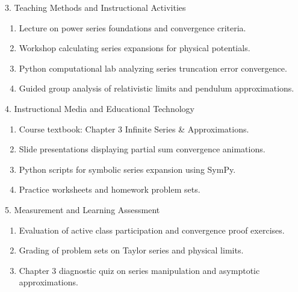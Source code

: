 \newpage

\begin{planbox}[colframe=rbruNavy!85!black, colbacktitle=rbruNavy!85!black]{3. Teaching Methods and Instructional Activities}
\begin{enumerate}[topsep=2pt, itemsep=1pt, partopsep=0pt, parsep=0pt, leftmargin=1.5em]
    \item Lecture on power series foundations and convergence criteria.
    \item Workshop calculating series expansions for physical potentials.
    \item Python computational lab analyzing series truncation error convergence.
    \item Guided group analysis of relativistic limits and pendulum approximations.
\end{enumerate}
\end{planbox}

\begin{planbox}[colframe=rbruGold!90!black, colbacktitle=rbruGold!90!black]{4. Instructional Media and Educational Technology}
\begin{enumerate}[topsep=2pt, itemsep=1pt, partopsep=0pt, parsep=0pt, leftmargin=1.5em]
    \item Course textbook: Chapter 3 Infinite Series \& Approximations.
    \item Slide presentations displaying partial sum convergence animations.
    \item Python scripts for symbolic series expansion using SymPy.
    \item Practice worksheets and homework problem sets.
\end{enumerate}
\end{planbox}

\begin{planbox}[colframe=rbruSlate, colbacktitle=rbruSlate]{5. Measurement and Learning Assessment}
\begin{enumerate}[topsep=2pt, itemsep=1pt, partopsep=0pt, parsep=0pt, leftmargin=1.5em]
    \item Evaluation of active class participation and convergence proof exercises.
    \item Grading of problem sets on Taylor series and physical limits.
    \item Chapter 3 diagnostic quiz on series manipulation and asymptotic approximations.
\end{enumerate}
\end{planbox}
\clearpage

